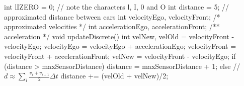 \begin{uppaalcode}[caption={Heavily customized listing.},
  label={lst:example2},
  captionpos=b, %
  float, %
  frame=shadowbox, rulesepcolor=\color{lightgray},
  numbers=left,numberstyle=\tiny,numbersep=3mm,
  xleftmargin=5mm]
int lIZERO = 0;   // note the characters l, I, 0 and O
int distance = 5; // approximated distance between cars
int velocityEgo, velocityFront; /* approximated velocities */
int accelerationEgo, accelerationFront; /** acceleration */
void updateDiscrete() {
    int velNew, velOld = velocityFront - velocityEgo;
    velocityEgo = velocityEgo + accelerationEgo;
    velocityFront = velocityFront + accelerationFront;
    velNew = velocityFront - velocityEgo;
    if (distance > maxSensorDistance) {
        distance = maxSensorDistance + 1;
    } else { // $d \approx \sum_i \frac{v_i+v_{i+1}}{2}\Delta t$
        distance += (velOld + velNew)/2;
    }
}
\end{uppaalcode}
